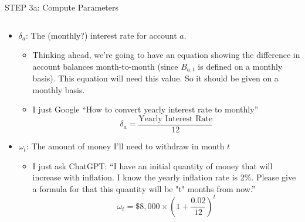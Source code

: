 \documentclass[10pt, aspectratio=169]{beamer}
\begin{document}
\begin{frame}{STEP 3a: Compute Parameters}
    \begin{columns}
        \begin{column}{\textwidth}
            \begin{itemize}
                \item $\delta_a$: The (monthly?) interest rate for account $a$.
                \begin{itemize}
                    \item Thinking ahead, we're going to have an equation showing the difference in account balances month-to-month (since $B_{a,t}$ is defined on a monthly basis). This equation will need this value. So it should be given on a monthly basis.
                    \item I just Google \enquote{How to convert yearly interest rate to monthly}
                    $$\delta_a = \frac{\text{Yearly Interest Rate}}{12}$$
                \end{itemize}
                \item $\omega_t$: The amount of money I'll need to withdraw in month $t$
                \begin{itemize}
                    \item I just ask ChatGPT: \enquote{I have an initial quantity of money that will increase with inflation. I know the yearly inflation rate is 2\%. Please give a formula for that this quantity will be "t" months from now.}
                    $$\omega_t = \$8,000 \times (1 + \frac{0.02}{12})^t$$
                \end{itemize}
            \end{itemize}
        \end{column}
    \end{columns}
\end{frame}
\end{document}
